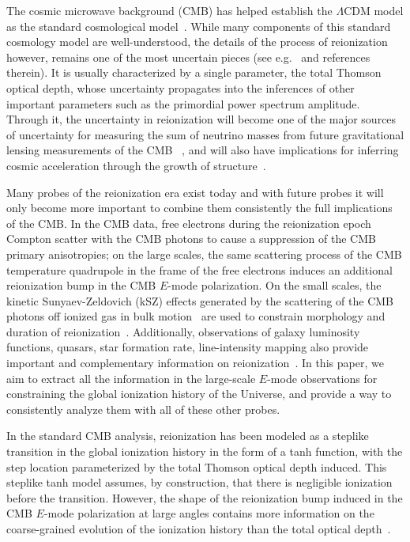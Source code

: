 \documentclass[aps,prd,twocolumn,amsmath,amssymb,showpacs,floatfix,superscriptaddress,nofootinbib]{revtex4-1}
\begin{document}
The cosmic microwave background (CMB) has helped establish the $\Lambda$CDM model as the standard cosmological model~\cite{Aghanim:2018eyx}. While many components of this standard cosmology model are well-understood, the details of the process of reionization however, remains one of the most uncertain pieces (see e.g.~\cite{2016ASSL..423.....M} and references therein).  It is usually characterized by a single parameter, the total Thomson optical depth, whose  uncertainty propagates into the inferences of other important parameters such as the primordial power spectrum amplitude. Through it, the uncertainty in reionization will become one of the major sources of uncertainty for measuring the sum of neutrino masses from future gravitational lensing measurements of the CMB~ \cite{Smith:2006nk}, 
and will also have implications for inferring cosmic acceleration through the growth of structure~\cite{Hu:2003pt}. 

Many probes of  the reionization era exist today and with future probes it will only become more important to combine them consistently the full implications of the CMB. In the CMB data, free electrons during the reionization epoch Compton scatter with the CMB photons to cause a suppression of the CMB primary anisotropies; on the large scales, the same scattering process of the CMB temperature quadrupole in the frame of the free electrons induces an additional reionization bump in the CMB $E$-mode polarization. On the small scales, the kinetic Sunyaev-Zeldovich (kSZ) effects generated by the scattering of the CMB photons off ionized gas in bulk motion~\cite{Sunyaev:1970er, Sunyaev:1980vz} are used to constrain morphology and duration of reionization~\cite{mcquinn_2005,mesinger_2012_kSZ}. Additionally, observations of galaxy luminosity functions, quasars, star formation rate, line-intensity mapping also provide important and complementary information on reionization~\cite{2016ASSL..423.....M}. In this paper, we aim to extract all the information in the large-scale $E$-mode observations for constraining the global ionization history of the Universe, and provide a way to consistently analyze them with all of these other probes.
 
In the standard CMB analysis, reionization has been  modeled as a steplike transition in the global ionization history in the form of a tanh function, with the step location parameterized by the total Thomson optical depth induced. This steplike tanh model assumes, by construction, that there is negligible ionization before the transition. However, the shape of the reionization bump induced in the CMB $E$-mode polarization at large angles contains more information on the coarse-grained evolution of the ionization history than the total optical depth~\cite{Hu:2003gh, Mortonson:2007hq}. 
\end{document}
